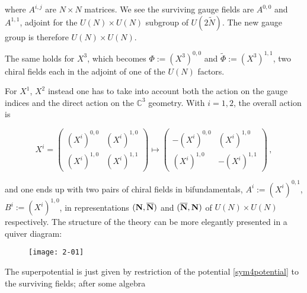 where $A^{i,j}$ are $N\times N$ matrices. We see the surviving gauge fields are $A^{0,0}$ and $A^{1,1}$, adjoint for the $U(N) \times U(N)$ subgroup of $U(2\tilde N)$. The new gauge group is therefore $U(N) \times U(N)$.

The same holds for $X^3$, which becomes $\Phi := (X^3)^{0,0}$ and $\tilde \Phi := (X^3)^{1,1}$, two chiral fields each in the adjoint of one of the $U(N)$ factors.

For $X^1$, $X^2$ instead one has to take into account both the action on the gauge indices and the direct action on the $\mathbb{C}^3$ geometry. With $i=1,2$, the overall action is

\begin{equation}
	X^i = \begin{pmatrix} 
			(X^i)^{0,0} & (X^i)^{1,0} \\
			(X^i)^{1,0} & (X^i)^{1,1} 
		\end{pmatrix}\mapsto \begin{pmatrix} 
			-(X^i)^{0,0} & (X^i)^{1,0} \\
			(X^i)^{1,0} & -(X^i)^{1,1} 
		\end{pmatrix}\,,
\end{equation}

and one ends up with two pairs of chiral fields in bifundamentals, $A^i := (X^i)^{0,1}$, $B^i := (X^i)^{1,0}$, in representations $(\mathbf{N}, \overline{\mathbf{N}})$ and $(\overline{\mathbf{N}}, \mathbf{N})$ of $U(N)\times U(N)$ respectively. The structure of the theory can be more elegantly presented in a quiver diagram:

\begin{figure}[H]
	\centering
	\texttt{[image: 2-01]}
\end{figure}

The superpotential is just given by restriction of the \SYM potential \eqref{sym4potential} to the surviving fields; after some algebra


